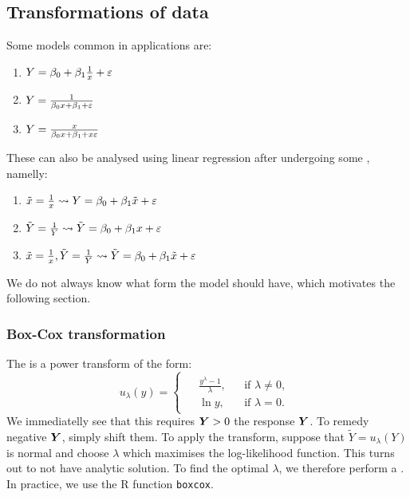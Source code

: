 \subsection{Transformations of data}
Some models common in applications are:
\begin{enumerate}
    \item $Y=\beta_0+\beta_1\frac{1}{x}+\varepsilon$
    \item $Y=\frac{1}{\beta_0 x + \beta_1 + \varepsilon}$
    \item $Y=\frac{x}{\beta_0 x + \beta_1 + x\varepsilon}$
\end{enumerate}
These can also be analysed using linear regression after undergoing some , namelly:
\begin{enumerate}
    \item $\tilde{x}=\frac{1}{x} \leadsto Y=\beta_0+\beta_1\tilde{x}+\varepsilon$
    \item $\tilde{Y}=\frac{1}{Y} \leadsto \tilde{Y}=\beta_0+\beta_1{x}+\varepsilon$
    \item $\tilde{x}=\frac{1}{x},\tilde{Y}=\frac{1}{Y} \leadsto \tilde{Y}=\beta_0+\beta_1\tilde{x}+\varepsilon$
\end{enumerate}
We do not always know what form the model should have, which motivates the following section.

\subsubsection{Box-Cox transformation}
The  is a power transform of the form:
\begin{equation}
    \boxed{
        u_{\lambda}(y) =
        \begin{cases}
            \begin{aligned}
                &\frac{y^\lambda-1}{\lambda}, && \text{if } \lambda \ne 0, \\
                &\ln{y}, && \text{if } \lambda = 0.
            \end{aligned}
        \end{cases}        
    }
\end{equation}
We immediatelly see that this requires $\boldsymbol{Y}>0$ the response $\boldsymbol{Y}$. To remedy negative $\boldsymbol{Y}$, simply shift them. To apply the transform, suppose that $\tilde{Y} = u_{\lambda}(Y)$ is normal and choose $\lambda$ which maximises the log-likelihood function. This turns out to not have analytic solution. 
To find the optimal $\lambda$, we therefore perform a . In practice, we use the R function \texttt{boxcox}. 

